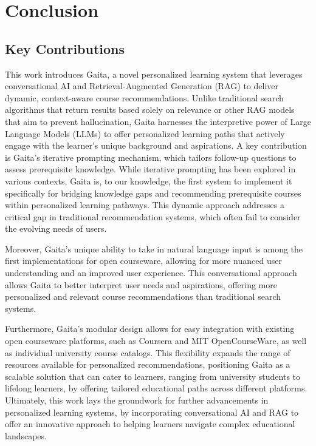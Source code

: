\chapter{Conclusion} \label{chap:chap-7}



\section{Key Contributions}
This work introduces Gaita, a novel personalized learning system that leverages conversational AI and Retrieval-Augmented Generation (RAG) to deliver dynamic, context-aware course recommendations. Unlike traditional search algorithms that return results based solely on relevance or other RAG models that aim to prevent hallucination, Gaita harnesses the interpretive power of Large Language Models (LLMs) to offer personalized learning paths that actively engage with the learner’s unique background and aspirations. A key contribution is Gaita’s iterative prompting mechanism, which tailors follow-up questions to assess prerequisite knowledge. While iterative prompting has been explored in various contexts, Gaita is, to our knowledge, the first system to implement it specifically for bridging knowledge gaps and recommending prerequisite courses within personalized learning pathways. This dynamic approach addresses a critical gap in traditional recommendation systems, which often fail to consider the evolving needs of users. 

Moreover, Gaita’s unique ability to take in natural language input is among the first implementations for open courseware, allowing for more nuanced user understanding and an improved user experience. This conversational approach allows Gaita to better interpret user needs and aspirations, offering more personalized and relevant course recommendations than traditional search systems.

Furthermore, Gaita’s modular design allows for easy integration with existing open courseware platforms, such as Coursera and MIT OpenCourseWare, as well as individual university course catalogs. This flexibility expands the range of resources available for personalized recommendations, positioning Gaita as a scalable solution that can cater to learners, ranging from university students to lifelong learners, by offering tailored educational paths across different platforms. Ultimately, this work lays the groundwork for further advancements in personalized learning systems, by incorporating conversational AI and RAG to offer an innovative approach to helping learners navigate complex educational landscapes.

